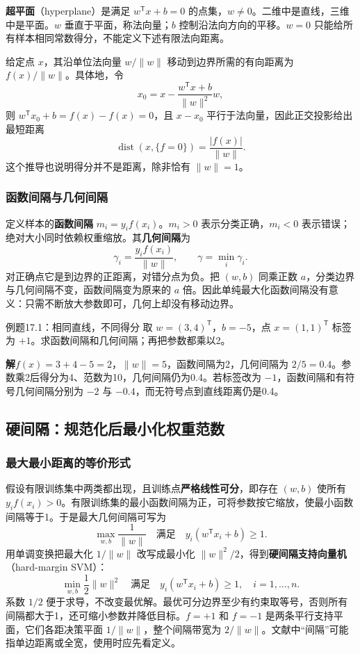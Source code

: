 \documentclass[UTF8,fontset=none,zihao=-4,a4paper]{ctexart}
\newcommand{\term}[1]{\textbf{#1}}
\newcommand{\sol}{\par\noindent\textbf{解}\quad}
\numberwithin{equation}{section}
\numberwithin{figure}{section}
\begin{document}
\term{超平面}（hyperplane）是满足 $w^{\mathsf T}x+b=0$ 的点集，$w\ne0$。二维中是直线，三维中是平面。$w$ 垂直于平面，称法向量；$b$ 控制沿法向方向的平移。$w=0$ 只能给所有样本相同常数得分，不能定义下述有限法向距离。

给定点 $x$，其沿单位法向量 $w/\|w\|$ 移动到边界所需的有向距离为 $f(x)/\|w\|$。具体地，令
\[
 x_0=x-\frac{w^{\mathsf T}x+b}{\|w\|^2}w,
\]
则 $w^{\mathsf T}x_0+b=f(x)-f(x)=0$，且 $x-x_0$ 平行于法向量，因此正交投影给出最短距离
\[
 \operatorname{dist}(x,\{f=0\})=\frac{|f(x)|}{\|w\|}.
\]
这个推导也说明得分并不是距离，除非恰有 $\|w\|=1$。

\subsubsection{函数间隔与几何间隔}
定义样本的\term{函数间隔} $m_i=y_if(x_i)$。$m_i>0$ 表示分类正确，$m_i<0$ 表示错误；绝对大小同时依赖权重缩放。其\term{几何间隔}为
\[
 \gamma_i=\frac{y_if(x_i)}{\|w\|},\qquad
 \gamma=\min_i\gamma_i.
\]
对正确点它是到边界的正距离，对错分点为负。把 $(w,b)$ 同乘正数 $a$，分类边界与几何间隔不变，函数间隔变为原来的 $a$ 倍。因此单纯最大化函数间隔没有意义：只需不断放大参数即可，几何上却没有移动边界。

\begin{infobox}[unbreakable]{例题17.1：相同直线，不同得分}
取 $w=(3,4)^{\mathsf T}$，$b=-5$，点 $x=(1,1)^{\mathsf T}$ 标签为 $+1$。求函数间隔和几何间隔；再把参数都乘以2。
\sol $f(x)=3+4-5=2$，$\|w\|=5$，函数间隔为2，几何间隔为 $2/5=0.4$。参数乘2后得分为4、范数为10，几何间隔仍为0.4。若标签改为 $-1$，函数间隔和有符号几何间隔分别为 $-2$ 与 $-0.4$，而无符号点到直线距离仍是0.4。
\end{infobox}

\subsection{硬间隔：规范化后最小化权重范数}
\subsubsection{最大最小距离的等价形式}
假设有限训练集中两类都出现，且训练点\term{严格线性可分}，即存在 $(w,b)$ 使所有 $y_if(x_i)>0$。有限训练集的最小函数间隔为正，可将参数按它缩放，使最小函数间隔等于1。于是最大几何间隔可写为
\[
 \max_{w,b}\frac1{\|w\|}\quad\text{满足}\quad y_i(w^{\mathsf T}x_i+b)\ge1.
\]
用单调变换把最大化 $1/\|w\|$ 改写成最小化 $\|w\|^2/2$，得到\term{硬间隔支持向量机}（hard-margin SVM）：
\begin{equation}\label{eq:svm-hard}
 \min_{w,b}\frac12\|w\|^2
 \quad\text{满足}\quad y_i(w^{\mathsf T}x_i+b)\ge1,\quad i=1,\ldots,n.
\end{equation}
系数 $1/2$ 便于求导，不改变最优解。最优可分边界至少有约束取等号，否则所有间隔都大于1，还可缩小参数并降低目标。$f=+1$ 和 $f=-1$ 是两条平行支持平面，它们各距决策平面 $1/\|w\|$，整个间隔带宽为 $2/\|w\|$。文献中“间隔”可能指单边距离或全宽，使用时应先看定义。
\end{document}
